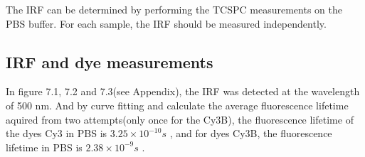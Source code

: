 \documentclass[a4paper,english,12pt,bibliography=totoc]{scrreprt}
\begin{document}
The IRF can be determined by performing the TCSPC measurements on the PBS buffer. For each sample, the IRF should be measured independently.\\

\subsection{IRF and dye measurements}
In figure 7.1, 7.2 and 7.3(see Appendix), the IRF was detected at the wavelength of 500 nm. And by curve fitting and calculate the average fluorescence lifetime aquired from two attempts(only once for the Cy3B), the fluorescence lifetime of the dyes Cy3 in PBS is $3.25 \times 10^{-10}s$ %
, and for dyes Cy3B, the fluorescence lifetime in PBS is $2.38 \times 10^{-9}s$ %
. 
\end{document}
